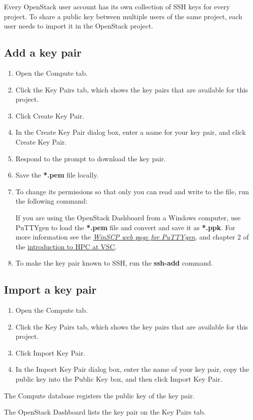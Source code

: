  Every OpenStack user account has its own collection of
SSH keys for every project.  To share a public key between multiple
users of the same project, each user needs to import it in the
OpenStack project.

\subsection*{Add a key pair}\label{add-a-key-pair}
\begin{enumerate}
\item Open the Compute tab.
\item Click the Key Pairs tab, which shows the key pairs that are
  available for this project.
\item Click Create Key Pair.
\item In the Create Key Pair dialog box, enter a name for your key
  pair, and click Create Key Pair.
\item Respond to the prompt to download the key pair.
\item Save the \textbf{*.pem} file locally.
\item To change its permissions so that only you can read and write to
  the file, run the following command:

  \begin{prompt}
  \end{prompt}

   If you are using the \gls{OpenStack Dashboard} from a
  Windows computer, use PuTTYgen to load the \textbf{*.pem} file and
  convert and save it as \textbf{*.ppk}.  For more information see the
  \href{https://winscp.net/eng/docs/ui_puttygen}{\emph{WinSCP web page
      for PuTTYgen}}, and chapter 2 of the
  \href{https://hpcugent.github.io/vsc\_user\_docs}{introduction to
    HPC at VSC}.

\item To make the key pair known to SSH, run the \textbf{ssh-add}
  command.

  \begin{prompt}
  \end{prompt}
\end{enumerate}

\subsection*{Import a key pair}\label{import-a-key-pair}
\begin{enumerate}
\item Open the Compute tab.
\item Click the Key Pairs tab, which shows the key pairs that are
  available for this project.
\item Click Import Key Pair.
\item In the Import Key Pair dialog box, enter the name of your key
  pair, copy the public key into the Public Key box, and then click
  Import Key Pair.
\end{enumerate}

The Compute database registers the public key of the key pair.

The \gls{OpenStack Dashboard} lists the key pair on the Key Pairs tab.

